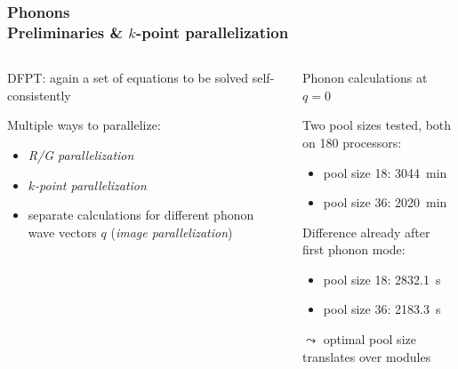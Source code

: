 \documentclass[aspectratio=169]{beamer}
\begin{document}
\begin{frame}
	\frametitle{Phonons\\ Preliminaries \& \(k\)-point parallelization}

	\begin{columns}
		\begin{column}{0.5\textwidth}

			DFPT: again a set of equations to be solved self-consistently

			\vspace{10pt}

			Multiple ways to parallelize:

			\begin{itemize}
				\item \emph{R/G parallelization}
				\item \emph{\(k\)-point parallelization}
				\item separate calculations for different phonon wave vectors \(q\) (\emph{image parallelization})
			\end{itemize}
		\end{column}
		\pause
		\begin{column}{0.5\textwidth}
			Phonon calculations at \(q = 0\)

			Two pool sizes tested, both on 180 processors:
			\begin{itemize}
				\item pool size 18: \SI{3044}{\minute}
				\item pool size 36: \SI{2020}{\minute}
			\end{itemize}

			\vspace{10pt}

			Difference already after first phonon mode:
			\begin{itemize}
				\item pool size 18: \SI{2832.1}{\second}
				\item pool size 36: \SI{2183.3}{\second}
			\end{itemize}

			\(\leadsto\) optimal pool size translates over modules
		\end{column}
	\end{columns}
\end{frame}

%
%
%
\end{document}
